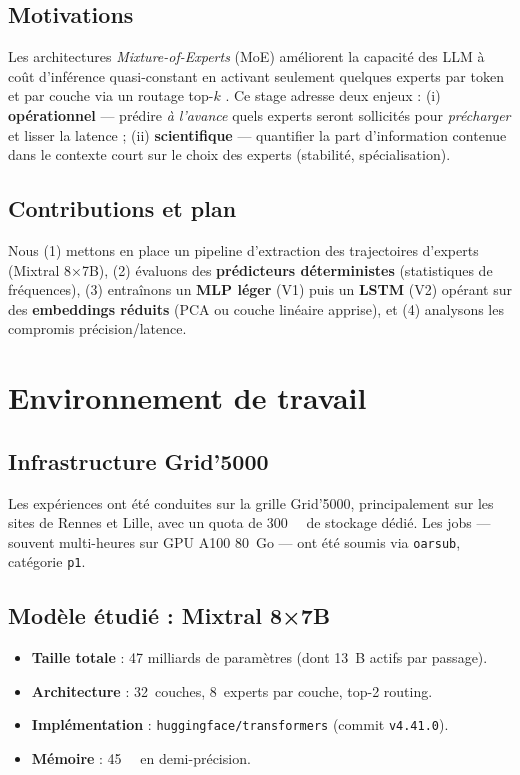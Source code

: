 \documentclass{article}
\begin{document}




\subsection{Motivations}
Les architectures \emph{Mixture-of-Experts} (MoE) améliorent la capacité des LLM à coût d'inférence quasi-constant en activant seulement quelques experts par token et par couche via un routage top-$k$ \parencite{Shazeer2017, Lepikhin2020, Fedus2021, Du2022glam, Cai2024}. 
Ce stage adresse deux enjeux : (i) \textbf{opérationnel} — prédire \emph{à l'avance} quels experts seront sollicités pour \emph{précharger} et lisser la latence ; (ii) \textbf{scientifique} — quantifier la part d'information contenue dans le contexte court sur le choix des experts (stabilité, spécialisation).

\subsection{Contributions et plan}
Nous (1) mettons en place un pipeline d'extraction des trajectoires d'experts (Mixtral 8×7B), (2) évaluons des \textbf{prédicteurs déterministes} (statistiques de fréquences), (3) entraînons un \textbf{MLP léger} (V1) puis un \textbf{LSTM} (V2) opérant sur des \textbf{embeddings réduits} (PCA ou couche linéaire apprise), et (4) analysons les compromis précision/latence.

\section{Environnement de travail}

\subsection{Infrastructure Grid'5000}
Les expériences ont été conduites sur la grille Grid'5000, principalement sur les sites de Rennes et Lille, avec un quota de \SI{300}{\giga\byte} de stockage dédié. Les jobs — souvent multi-heures sur GPU A100 80~Go — ont été soumis via \texttt{oarsub}, catégorie \texttt{p1}.

\subsection{Modèle étudié : Mixtral 8×7B}
\begin{itemize}
  \item \textbf{Taille totale} : 47 milliards de paramètres (dont 13~B actifs par passage).
  \item \textbf{Architecture} : 32~couches, 8~experts par couche, top-2 routing.
  \item \textbf{Implémentation} : \texttt{huggingface/transformers} (commit \texttt{v4.41.0}).
  \item \textbf{Mémoire} : \SI{45}{\giga\byte} en demi-précision.
\end{itemize}
\end{document}
